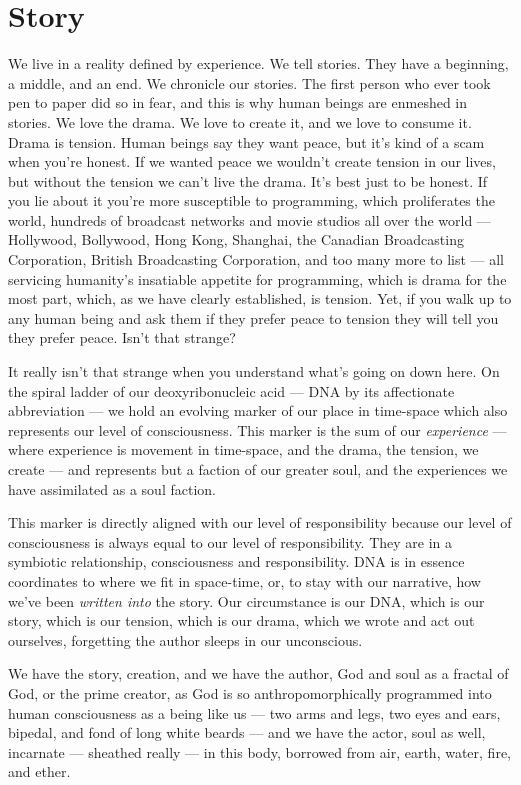 \documentclass[letterpaper,11pt,twoside,titlepage,onecolumn,openany]{book}
\begin{document}
\section*{Story}\label{story}

We live in a reality defined by experience. We tell stories. They have a
beginning, a middle, and an end. We chronicle our stories. The first
person who ever took pen to paper did so in fear, and this is why human
beings are enmeshed in stories. We love the drama. We love to create it,
and we love to consume it. Drama is tension. Human beings say they want
peace, but it's kind of a scam when you're honest. If we wanted peace we
wouldn't create tension in our lives, but without the tension we can't
live the drama. It's best just to be honest. If you lie about it you're
more susceptible to programming, which proliferates the world, hundreds
of broadcast networks and movie studios all over the world ---
Hollywood, Bollywood, Hong Kong, Shanghai, the Canadian Broadcasting
Corporation, British Broadcasting Corporation, and too many more to list
--- all servicing humanity's insatiable appetite for programming, which
is drama for the most part, which, as we have clearly established, is
tension. Yet, if you walk up to any human being and ask them if they
prefer peace to tension they will tell you they prefer peace. Isn't that
strange?

It really isn't that strange when you understand what's going on down
here. On the spiral ladder of our deoxyribonucleic acid --- DNA by its
affectionate abbreviation --- we hold an evolving marker of our place in
time-space which also represents our level of consciousness. This marker
is the sum of our \emph{experience} --- where experience is movement in
time-space, and the drama, the tension, we create --- and represents but
a faction of our greater soul, and the experiences we have assimilated
as a soul faction.

This marker is directly aligned with our level of responsibility because
our level of consciousness is always equal to our level of
responsibility. They are in a symbiotic relationship, consciousness and
responsibility. DNA is in essence coordinates to where we fit in
space-time, or, to stay with our narrative, how we've been \emph{written
into} the story. Our circumstance is our DNA, which is our story, which
is our tension, which is our drama, which we wrote and act out
ourselves, forgetting the author sleeps in our unconscious.

We have the story, creation, and we have the author, God and soul as a
fractal of God, or the prime creator, as God is so anthropomorphically
programmed into human consciousness as a being like us --- two arms and
legs, two eyes and ears, bipedal, and fond of long white beards --- and
we have the actor, soul as well, incarnate --- sheathed really --- in
this body, borrowed from air, earth, water, fire, and ether.
\end{document}
